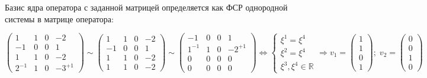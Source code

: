 \documentclass{article}
\begin{document}
\begin{center}
Базис ядра оператора с заданной матрицей определяется как ФСР однородной системы в матрице оператора:
\end{center}
\noindent$$\left(\begin{array}{llll}1 & 1 & 0 & -2 \\ -1 & 0 & 0 & 1 \\ 1 & 1 & 0 & -2 \\ 2^{-1} & 1 & 0 & -3^{+1}\end{array}\right) \sim \left(\begin{array}{rrrr}1 & 1 & 0 & -2 \\ -1 & 0 & 0 & 1 \\ 1 & 1 & 0 & -2 \\ 1 & 1 & 0 & -2\end{array}\right) \sim \left(\begin{array}{lrrl}-1 & 0 & 0 & 1 \\ 1^{-1} & 1 & 0 & -2^{+1} \\0 & 0 & 0 & 0 \\ 0 & 0 & 0 & 0\end{array}\right) \Leftrightarrow \begin{cases}
\xi^1= \xi^4 \\
\xi^2 =  \xi^4 \\
\xi^3, \xi^4 \in \mathbb{R}
\end{cases} \Rightarrow v_1 = \begin{pmatrix}1 \\ 1 \\ 0 \\ 1\end{pmatrix};\; v_2 = \begin{pmatrix}0 \\ 0 \\ 1 \\ 0\end{pmatrix}$$
\end{document}
